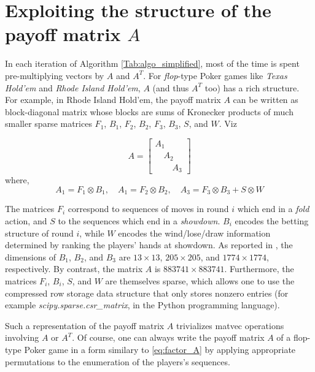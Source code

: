 \documentclass[12pt]{article}
\begin{document}
\section{Exploiting the structure of the payoff matrix $A$}
In each iteration of Algorithm \ref{Tab:algo_simplified}, most of the time is spent
pre-multiplying vectors by $A$ and $A^T$. For \textit{flop}-type Poker games like \textit{Texas Hold'em} and  \textit{Rhode Island Hold'em}, $A$ (and thus $A^T$ too) has a rich structure. For example, in Rhode Island Hold'em, the payoff matrix $A$ can be written as block-diagonal matrix whose blocks are sums of Kronecker products of much smaller sparse matrices \cite{hoda2010smoothing} $F_1$, $B_1$, $F_2$, $B_2$, $F_3$, $B_3$, $S$, and $W$. Viz

\begin{equation}
  A = \begin{bmatrix}A_1\hspace{2em}\\\hspace{1em}A_2\hspace{1em}\\\hspace{2em}A_3\end{bmatrix}
\label{eq:factor_A}
\end{equation}
where,
\begin{equation}
A_1 = F_1 \otimes B_1, \hspace{1em} A_1 = F_2 \otimes B_2, \hspace{1em} A_3 = F_3 \otimes B_3 + S \otimes W
\end{equation}

The matrices $F_i$ correspond to sequences of moves in round $i$ which end in a \textit{fold} action, and $S$ to the sequences which end in a \textit{showdown}. $B_i$ encodes the betting structure of round $i$, while $W$ encodes the wind/lose/draw information determined by ranking the players' hands at showdown. As reported in \cite{hoda2010smoothing}, the dimensions of $B_1$, $B_2$, and $B_3$ are $13 \times 13$, $205 \times 205$, and $1774 \times 1774$, respectively. By
contrast, the matrix $A$ is $883741 \times 883741$. Furthermore, the matrices $F_i$, $B_i$,
$S$, and $W$ are themselves sparse, which allows one to use the compressed row storage data structure that only stores nonzero entries (for example \textit{scipy.sparse.csr\_matrix}, in the Python programming language).

Such a representation of the payoff matrix $A$ trivializes matvec operations involving $A$ or $A^T$. Of course, one can always write the payoff matrix $A$ of a flop-type Poker game in a form similary to \eqref{eq:factor_A} by applying appropriate permutations to the enumeration of the players's sequences.
\end{document}
